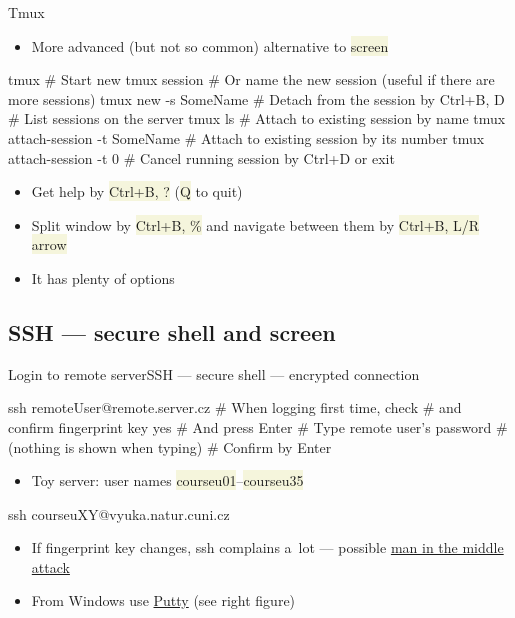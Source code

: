 \documentclass[compress, xelatex, 11pt, xcolor=svgnames, aspectratio=169,
	hyperref={
		bookmarks=true,
		unicode=true,
		colorlinks=true,
		pdftitle={Linux, command line and MetaCentrum},
		plainpages=false,
		pdfauthor={Vojtech Zeisek},
		pdfsubject={Course about use of Linux command line, writing shell scripts and using MetaCentrum of CESNET},
		pdfcreator={XeLaTeX},
		pdfkeywords={Linux, GNU, BASH, shell, command line, MetaCentrum},
		linkcolor=DarkRed, %
		anchorcolor=DarkBlue, %
		citecolor=Indigo, %
		filecolor=NavyBlue, %
		menucolor=DarkMagenta, %
		urlcolor=DarkBlue, %
		},
	url={hyphens, lowtilde} %
	]{beamer}
\renewcommand{\texttt}[1]{\colorbox{Beige}{{\ttfamily #1}}}
\begin{document}
\begin{frame}[fragile]{Tmux}
	\begin{itemize}
		\item More advanced (but not so common) alternative to \texttt{screen}
	\end{itemize}
	\vfill
	\begin{bashcode}
    tmux # Start new tmux session
    # Or name the new session (useful if there are more sessions)
    tmux new -s SomeName
    # Detach from the session by Ctrl+B, D
    # List sessions on the server
    tmux ls
    # Attach to existing session by name
    tmux attach-session -t SomeName
    # Attach to existing session by its number
    tmux attach-session -t 0
    # Cancel running session by Ctrl+D or exit
	\end{bashcode}
	\vfill
	\begin{itemize}
		\item Get help by \texttt{Ctrl+B, ?} (\texttt{Q} to quit)
		\item Split window by \texttt{Ctrl+B, \%} and navigate between them by \texttt{Ctrl+B, L/R arrow}
		\item It has plenty of options
	\end{itemize}
\end{frame}

\subsection[SSH]{SSH --- secure shell and screen}

\begin{frame}[fragile]{Login to remote server}{SSH --- secure shell --- encrypted connection}
	\label{ssh}
	\begin{multicols}{2}
		\begin{bashcode}
    ssh remoteUser@remote.server.cz
    # When logging first time, check
    # and confirm fingerprint key
    yes # And press Enter
    # Type remote user's password
    # (nothing is shown when typing)
    # Confirm by Enter
		\end{bashcode}
		\vfill
		\begin{itemize}
			\item Toy server: user names \texttt{courseu01}--\texttt{courseu35}
		\end{itemize}
		\vfill
		\begin{bashcode}
    ssh courseuXY@vyuka.natur.cuni.cz
		\end{bashcode}
		\vfill
		\begin{itemize}
			\item If fingerprint key changes, ssh complains a~lot --- possible \href{https://en.wikipedia.org/wiki/Man-in-the-middle_attack}{man in the middle attack}
			\item From Windows use \href{https://www.putty.org/}{Putty} (see right figure)
		\end{itemize}
		\begin{center}
			\texttt{[image: putty.png]}
		\end{center}
	\end{multicols}
\end{frame}
\end{document}
